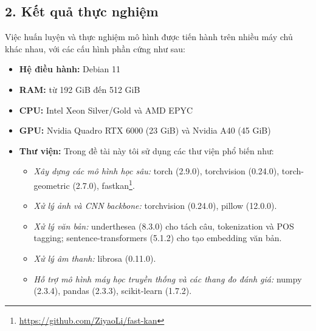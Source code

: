 \newpage
\subsection{2. Kết quả thực nghiệm}
Việc huấn luyện và thực nghiệm mô hình được tiến hành trên nhiều máy chủ khác nhau, với các cấu hình phần cứng như sau:
\begin{itemize}[label={--}, itemsep=1pt]
    \item \textbf{Hệ điều hành:} Debian 11
    \item \textbf{RAM:} từ 192 GiB đến 512 GiB
    \item \textbf{CPU:} Intel Xeon Silver/Gold và AMD EPYC
    \item \textbf{GPU:} Nvidia Quadro RTX 6000 (23 GiB) và Nvidia A40 (45 GiB)
    \item \textbf{Thư viện:} Trong đề tài này tôi sử dụng các thư viện phổ biến như:
    \begin{itemize}[label={+}, itemsep=1pt]
        \item \textit{Xây dựng các mô hình học sâu:} torch (2.9.0), torchvision (0.24.0), torch-geometric (2.7.0), fastkan\footnote{\url{https://github.com/ZiyaoLi/fast-kan}}.
        \item \textit{Xử lý ảnh và CNN backbone:} torchvision (0.24.0), pillow (12.0.0).
        \item \textit{Xử lý văn bản:} underthesea (8.3.0) cho tách câu, tokenization và POS tagging; sentence-transformers (5.1.2) cho tạo embedding văn bản.
        \item \textit{Xử lý âm thanh:} librosa (0.11.0).
        \item \textit{Hỗ trợ mô hình máy học truyền thống và các thang đo đánh giá:} numpy (2.3.4), pandas (2.3.3), scikit-learn (1.7.2).
    \end{itemize}
\end{itemize}







